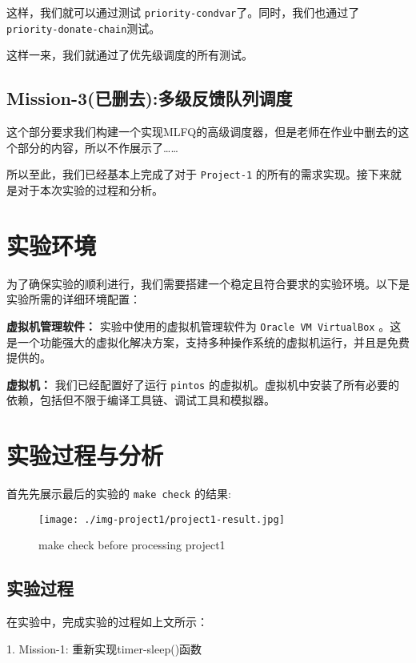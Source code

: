 \documentclass{article}
\begin{document}
	这样，我们就可以通过测试 \texttt{priority-condvar}了。同时，我们也通过了\texttt{priority-donate-chain}测试。
	
	这样一来，我们就通过了优先级调度的所有测试。
	
	\subsection{Mission-3(已删去):多级反馈队列调度}
	
	这个部分要求我们构建一个实现MLFQ的高级调度器，但是老师在作业中删去的这个部分的内容，所以不作展示了……
	
	所以至此，我们已经基本上完成了对于 \texttt{Project-1} 的所有的需求实现。接下来就是对于本次实验的过程和分析。
	
	\section{实验环境}
	
	为了确保实验的顺利进行，我们需要搭建一个稳定且符合要求的实验环境。以下是实验所需的详细环境配置：
	
	\textbf{虚拟机管理软件：} 实验中使用的虚拟机管理软件为 \texttt{Oracle VM VirtualBox} 。这是一个功能强大的虚拟化解决方案，支持多种操作系统的虚拟机运行，并且是免费提供的。
	
	\textbf{虚拟机：} 我们已经配置好了运行 \texttt{pintos} 的虚拟机。虚拟机中安装了所有必要的依赖，包括但不限于编译工具链、调试工具和模拟器。
	
	\section{实验过程与分析}
	
	首先先展示最后的实验的 \texttt{make check} 的结果:
	
	\begin{figure}[htbp]
		\centering
		\texttt{[image: ./img-project1/project1-result.jpg]}
		\caption{make check before processing project1}
		\label{fig:graph2}
	\end{figure}
	
	\subsection{实验过程}
	
	在实验中，完成实验的过程如上文所示：
	
	\setlength{\parindent}{2em}
	
	1. Mission-1: 重新实现timer-sleep()函数
	
\end{document}
